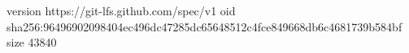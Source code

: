 version https://git-lfs.github.com/spec/v1
oid sha256:96496902098404ec496dc47285dc65648512c4fce849668db6c4681739b584bf
size 43840
